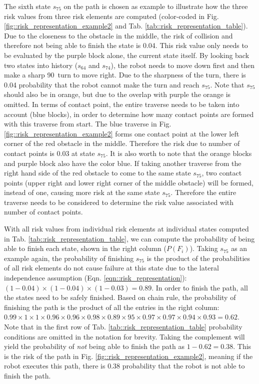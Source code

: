 \documentclass[letterpaper]{article} %
\begin{document}
The sixth state $s_{75}$ on the path is chosen as example to illustrate how the three risk values from three risk elements are computed (color-coded in Fig. \ref{fig::risk_representation_example2} and Tab. \ref{tab::risk_representation_table}). Due to the closeness to the obstacle in the middle, the risk of collision and therefore not being able to finish the state is 0.04. This risk value only needs to be evaluated by the purple block alone, the current state itself. By looking back two states into history ($s_{64}$ and $s_{74}$), the robot needs to move down first and then make a sharp 90\degree~turn to move right. Due to the sharpness of the turn, there is 0.04 probability that the robot cannot make the turn and reach $s_{75}$. Note that $s_{75}$ should also be in orange, but due to the overlap with purple the orange is omitted. In terms of contact point, the entire traverse needs to be taken into account (blue blocks), in order to determine how many contact points are formed with this traverse from start. The blue traverse in Fig. \ref{fig::risk_representation_example2} forms one contact point at the lower left corner of the red obstacle in the middle. Therefore the risk due to number of contact points is 0.03 at state $s_{75}$. It is also worth to note that the orange blocks and purple block also have the color blue. If taking another traverse from the right hand side of the red obstacle to come to the same state $s_{75}$, two contact points (upper right and lower right corner of the middle obstacle) will be formed, instead of one, causing more risk at the same state $s_{75}$. Therefore the entire traverse needs to be considered to determine the risk value associated with number of contact points.

With all risk values from individual risk elements at individual states computed in Tab. \ref{tab::risk_representation_table}, we can compute the probability of being able to finish each state, shown in the right column ($P(F_i)$). Taking $s_{75}$ as an example again, the probability of finishing $s_{75}$ is the product of the probabilities of all risk elements do not cause failure at this state due to the lateral independence assumption (Eqn. \ref{eqn::risk_representation}): $(1-0.04)\times(1-0.04)\times(1-0.03)=0.89$. In order to finish the path, all the states need to be safely finished. Based on chain rule, the probability of finishing the path is the product of all the entries in the right column: $0.99\times1\times1\times0.96\times0.96\times0.98\times0.89\times95\times0.97\times0.97\times0.94\times0.93=0.62$. Note that in the first row of Tab. \ref{tab::risk_representation_table} probability conditions are omitted in the notation for brevity. Taking the complement will yield the probability of \emph{not} being able to finish the path as $1-0.62=0.38$. This is the risk of the path in Fig. \ref{fig::risk_representation_example2}, meaning if the robot executes this path, there is 0.38 probability that the robot is not able to finish the path.
\end{document}
